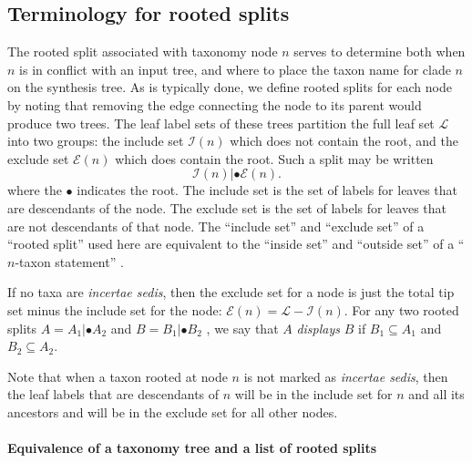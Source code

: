 \documentclass[english]{article}
\begin{document}
\subsection{Terminology for rooted splits}

The rooted split associated with taxonomy node $n$ serves to determine both when $n$ is in conflict
with an input tree, and where to place the taxon name for clade $n$ on the synthesis tree.
As is typically done, we define rooted splits for each node by noting that
removing the edge connecting the node to its parent would produce two trees.
The leaf label sets of these trees partition the full leaf set $\mathcal{L}$ into two groups: the include
set $\mathcal{I}(n)$ which does not contain the root, and the exclude set $\mathcal{E}(n)$
which does contain the root. Such a split may be written
\[ \mathcal{I}(n)|\bullet\mathcal{E}(n).\]
where the $\bullet$ indicates the root. The include set is the set of labels for leaves that are
descendants of the node. The exclude set is the set of 
labels for leaves that are not descendants of that node.
The ``include set'' and ``exclude set'' of a ``rooted split'' used here are equivalent
    to the ``inside set'' and ``outside set'' of a ``$n$-taxon statement''
    \citep[\emph{sensu}][]{Wilkinson1994}.

If no taxa are \emph{incertae sedis},
then the exclude set for a node is just the total tip set minus the include set
for the node: $\mathcal{E}(n)  =\mathcal{L}-\mathcal{I}(n)$.
For any two rooted splits $A=A_{1}|\bullet A_{2}$
and $B=B_{1}|\bullet B_{2}$ , we say that $A$ \emph{displays }$B$ if $B_{1}\subseteq A_{1}$ and $B_{2}\subseteq A_{2}$.

Note that when a taxon rooted at node $n$ is not marked as \emph{incertae sedis},
then the leaf labels that are descendants of $n$ will be in the include set for
$n$ and all its ancestors and will be in the exclude set for all other nodes.

\paragraph{Equivalence of a taxonomy tree and a list of rooted splits}
\end{document}
